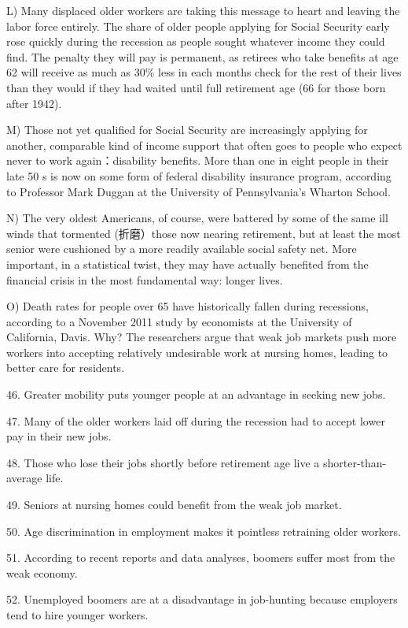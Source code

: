 \documentclass[UTF8,11pt]{ctexart}
\begin{document}
L) Many displaced older workers are taking this message to heart and leaving the labor force entirely. The share of older people applying for Social Security early rose quickly during the recession as people sought whatever income they could find. The penalty they will pay is permanent, as retirees who take benefits at age 62 will receive as much as 30\% less in each months check for the rest of their lives than they would if they had waited until full retirement age (66 for those born after 1942).


M) Those not yet qualified for Social Security are increasingly applying for another, comparable kind of income support that often goes to people who expect never to work again：disability benefits. More than one in eight people in their late 50 s is now on some form of federal disability insurance program, according to Professor Mark Duggan at the University of Pennsylvania’s Wharton School.


N) The very oldest Americans, of course, were battered by some of the same ill winds that tormented (折磨）those now nearing retirement, but at least the most senior were cushioned by a more readily available social safety net. More important, in a statistical twist, they may have actually benefited from the financial crisis in the most fundamental way: longer lives.


O) Death rates for people over 65 have historically fallen during recessions, according to a November 2011 study by economists at the University of California, Davis. Why? The researchers argue that weak job markets push more workers into accepting relatively undesirable work at nursing homes, leading to better care for residents.


46. Greater mobility puts younger people at an advantage in seeking new jobs.


47. Many of the older workers laid off during the recession had to accept lower pay in their new jobs.


48. Those who lose their jobs shortly before retirement age live a shorter-than-average life.


49. Seniors at nursing homes could benefit from the weak job market.


50. Age discrimination in employment makes it pointless retraining older workers.


51. According to recent reports and data analyses, boomers suffer most from the weak economy.


52. Unemployed boomers are at a disadvantage in job-hunting because employers tend to hire younger workers.
\end{document}
